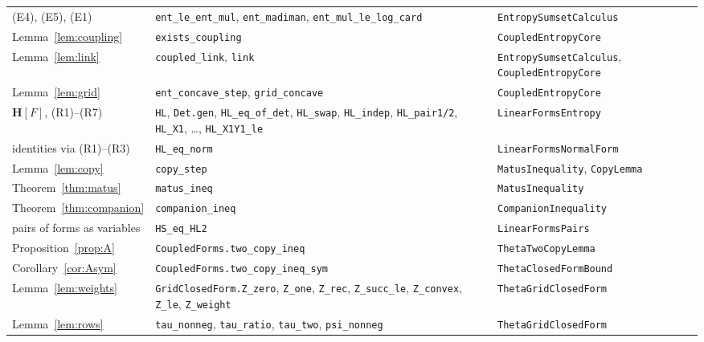 \documentclass[11pt]{amsart}
\theoremstyle{definition}
\theoremstyle{remark}
\numberwithin{equation}{section}
\newcommand{\Hb}{\mathbf{H}}
\newcommand{\lean}[1]{\texttt{#1}}
\begin{document}
{\begin{longtable}{@{}>{\raggedright\arraybackslash}p{2.6cm}>{\raggedright\arraybackslash}p{7.5cm}>{\raggedright\arraybackslash}p{4.6cm}@{}}
(E4), (E5), (E1) & \lean{ent\_\allowbreak{}le\_\allowbreak{}ent\_\allowbreak{}mul}, \lean{ent\_\allowbreak{}madiman}, \lean{ent\_\allowbreak{}mul\_\allowbreak{}le\_\allowbreak{}log\_\allowbreak{}card} & \lean{EntropySumsetCalculus}\\
Lemma~\ref{lem:coupling} & \lean{exists\_\allowbreak{}coupling} & \lean{CoupledEntropyCore}\\
Lemma~\ref{lem:link} & \lean{coupled\_\allowbreak{}link}, \lean{link} & \lean{EntropySumsetCalculus}, \lean{CoupledEntropyCore}\\
Lemma~\ref{lem:grid} & \lean{ent\_\allowbreak{}concave\_\allowbreak{}step}, \lean{grid\_\allowbreak{}concave} & \lean{CoupledEntropyCore}\\
$\Hb[F]$, (R1)--(R7) & \lean{HL}, \lean{Det.gen}, \lean{HL\_\allowbreak{}eq\_\allowbreak{}of\_\allowbreak{}det}, \lean{HL\_\allowbreak{}swap}, \lean{HL\_\allowbreak{}indep}, \lean{HL\_\allowbreak{}pair1/2}, \lean{HL\_\allowbreak{}X1}, \dots, \lean{HL\_\allowbreak{}X1Y1\_\allowbreak{}le} & \lean{LinearFormsEntropy}\\
identities via (R1)--(R3) & \lean{HL\_\allowbreak{}eq\_\allowbreak{}norm} & \lean{LinearFormsNormalForm}\\
Lemma~\ref{lem:copy} & \lean{copy\_\allowbreak{}step} & \lean{MatusInequality}, \lean{CopyLemma}\\
Theorem~\ref{thm:matus} & \lean{matus\_\allowbreak{}ineq} & \lean{MatusInequality}\\
Theorem~\ref{thm:companion} & \lean{companion\_\allowbreak{}ineq} & \lean{CompanionInequality}\\
pairs of forms as variables & \lean{HS\_\allowbreak{}eq\_\allowbreak{}HL2} & \lean{LinearFormsPairs}\\
Proposition~\ref{prop:A} & \lean{CoupledForms.two\_\allowbreak{}copy\_\allowbreak{}ineq} & \lean{ThetaTwoCopyLemma}\\
Corollary~\ref{cor:Asym} & \lean{CoupledForms.two\_\allowbreak{}copy\_\allowbreak{}ineq\_\allowbreak{}sym} & \lean{ThetaClosedFormBound}\\
Lemma~\ref{lem:weights} & \lean{GridClosedForm.Z\_\allowbreak{}zero}, \lean{Z\_\allowbreak{}one}, \lean{Z\_\allowbreak{}rec}, \lean{Z\_\allowbreak{}succ\_\allowbreak{}le}, \lean{Z\_\allowbreak{}convex}, \lean{Z\_\allowbreak{}le}, \lean{Z\_\allowbreak{}weight} & \lean{ThetaGridClosedForm}\\
Lemma~\ref{lem:rows} & \lean{tau\_\allowbreak{}nonneg}, \lean{tau\_\allowbreak{}ratio}, \lean{tau\_\allowbreak{}two}, \lean{psi\_\allowbreak{}nonneg} & \lean{ThetaGridClosedForm}\\

\end{longtable}}
\end{document}
